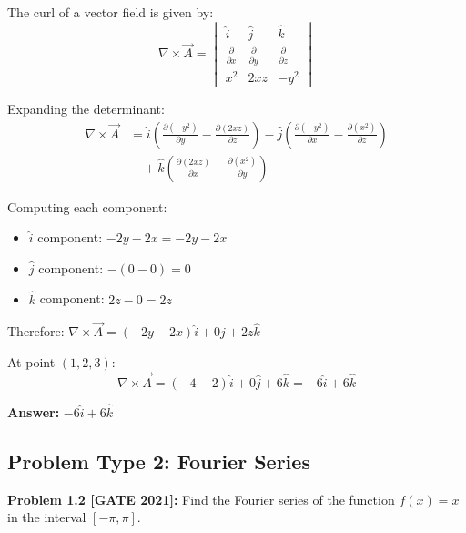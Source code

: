 \documentclass[12pt,a4paper]{article}
\begin{document}
\begin{solution}
The curl of a vector field is given by:
$$\nabla \times \vec{A} = \begin{vmatrix}
\hat{i} & \hat{j} & \hat{k} \\
\frac{\partial}{\partial x} & \frac{\partial}{\partial y} & \frac{\partial}{\partial z} \\
x^2 & 2xz & -y^2
\end{vmatrix}$$

Expanding the determinant:
\begin{align*}
\nabla \times \vec{A} &= \hat{i}\left(\frac{\partial(-y^2)}{\partial y} - \frac{\partial(2xz)}{\partial z}\right) - \hat{j}\left(\frac{\partial(-y^2)}{\partial x} - \frac{\partial(x^2)}{\partial z}\right) \\
&\quad + \hat{k}\left(\frac{\partial(2xz)}{\partial x} - \frac{\partial(x^2)}{\partial y}\right)
\end{align*}

Computing each component:
\begin{itemize}
    \item $\hat{i}$ component: $-2y - 2x = -2y - 2x$
    \item $\hat{j}$ component: $-(0 - 0) = 0$
    \item $\hat{k}$ component: $2z - 0 = 2z$
\end{itemize}

Therefore: $\nabla \times \vec{A} = (-2y - 2x)\hat{i} + 0\hat{j} + 2z\hat{k}$

At point $(1, 2, 3)$:
$$\nabla \times \vec{A} = (-4 - 2)\hat{i} + 0\hat{j} + 6\hat{k} = -6\hat{i} + 6\hat{k}$$

\textbf{Answer:} $-6\hat{i} + 6\hat{k}$
\end{solution}

\subsection{Problem Type 2: Fourier Series}

\textbf{Problem 1.2 [GATE 2021]:} Find the Fourier series of the function $f(x) = x$ in the interval $[-\pi, \pi]$.
\end{document}
